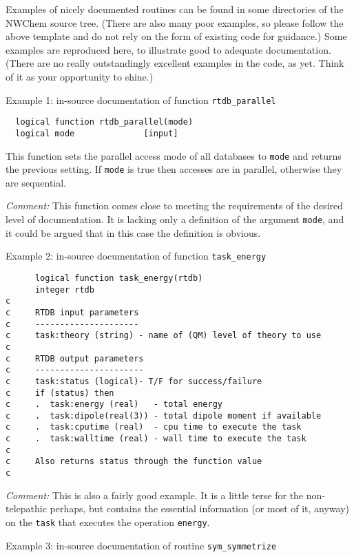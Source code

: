Examples of nicely documented routines can be found in some directories of
the NWChem source tree.  (There are also many poor examples, so please follow
the above template and do not rely
on the form of existing code for guidance.)  Some examples are reproduced
here, to illustrate good to adequate documentation.  (There are no really
outstandingly excellent examples in the code, as yet.  Think of it as your
opportunity to shine.)

Example 1: in-source documentation of function {\tt rtdb\_parallel}


\begin{verbatim}
  logical function rtdb_parallel(mode)
  logical mode              [input]
\end{verbatim}
This function sets the parallel access mode of all databases to {\tt mode} and returns the
previous setting. If {\tt mode} is true then accesses are in parallel, otherwise they are
sequential.

{\em Comment:} This function comes close to meeting the requirements of the
desired level of documentation.  It is lacking only a definition of the argument {\tt mode},
and it could be argued that in this case the definition is obvious.


Example 2: in-source documentation of function {\tt task\_energy}


\begin{verbatim}
      logical function task_energy(rtdb)
      integer rtdb
c
c     RTDB input parameters
c     ---------------------
c     task:theory (string) - name of (QM) level of theory to use
c     
c     RTDB output parameters
c     ----------------------
c     task:status (logical)- T/F for success/failure
c     if (status) then
c     .  task:energy (real)   - total energy
c     .  task:dipole(real(3)) - total dipole moment if available
c     .  task:cputime (real)  - cpu time to execute the task
c     .  task:walltime (real) - wall time to execute the task
c
c     Also returns status through the function value
c
\end{verbatim}


{\em Comment:} This is also a fairly good example.  It is a little terse for the non-telepathic
perhaps, but contains the essential information (or most of it, anyway) on the
{\tt task} that executes the operation {\tt energy}.



Example 3: in-source documentation of routine {\tt sym\_symmetrize}

